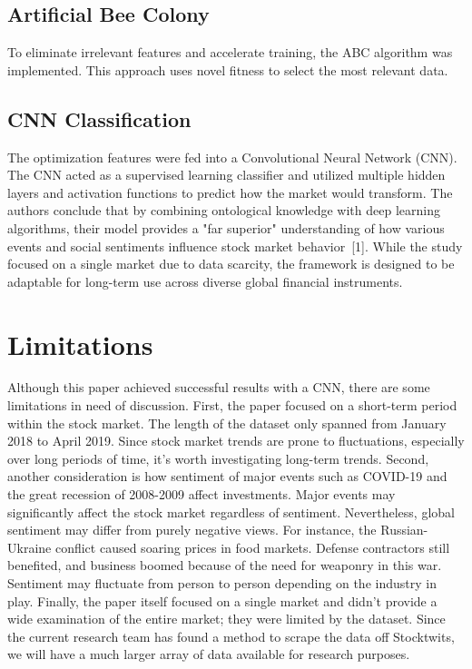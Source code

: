 \documentclass[12pt, onecolumn, letterpaper]{IEEEtran}
\begin{document}
\subsection{Artificial Bee Colony}
To eliminate irrelevant features and accelerate training, the ABC algorithm was implemented.
This approach uses novel fitness to select the most relevant data.

\subsection{CNN Classification}
The optimization features were fed into a Convolutional Neural Network (CNN).
The CNN acted as a supervised learning classifier and utilized multiple hidden layers and activation functions to predict how the market would transform.
The authors conclude that by combining ontological knowledge with deep learning algorithms, their model provides a "far superior" understanding of how various events and social sentiments influence stock market behavior~[1].
While the study focused on a single market due to data scarcity, the framework is designed to be adaptable for long-term use across diverse global financial instruments.

\section{Limitations}
Although this paper achieved successful results with a CNN, there are some limitations in need of discussion.
First, the paper focused on a short-term period within the stock market.
The length of the dataset only spanned from January 2018 to April 2019.
Since stock market trends are prone to fluctuations, especially over long periods of time, it's worth investigating long-term trends.
Second, another consideration is how sentiment of major events such as COVID-19 and the great recession of 2008-2009 affect investments.
Major events may significantly affect the stock market regardless of sentiment.
Nevertheless, global sentiment may differ from purely negative views.
For instance, the Russian-Ukraine conflict caused soaring prices in food markets.
Defense contractors still benefited, and business boomed because of the need for weaponry in this war.
Sentiment may fluctuate from person to person depending on the industry in play.
Finally, the paper itself focused on a single market and didn’t provide a wide examination of the entire market; they were limited by the dataset.
Since the current research team has found a method to scrape the data off Stocktwits, we will have a much larger array of data available for research purposes.
\end{document}

